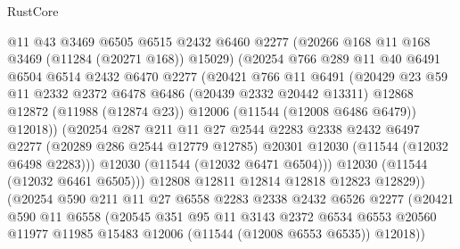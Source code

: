 \begin{lexlean}{RustCore}
\begin{coremodule}
                  @11
                  @43
                  @3469
                  @6505
                  @6515
                  @2432
                  @6460
                  @2277
                  (@20266 @168 @11 @168 @3469 (@11284 (@20271 @168)) @15029)
                  (@20254
                    @766
                    @289
                    @11
                    @40
                    @6491
                    @6504
                    @6514
                    @2432
                    @6470
                    @2277
                    (@20421
                      @766
                      @11
                      @6491
                      (@20429
                        @23
                        @59
                        @11
                        @2332
                        @2372
                        @6478
                        @6486
                        (@20439 @2332 @20442 @13311)
                        @12868
                        @12872
                        (@11988 (@12874 @23))
                        @12006
                        (@11544 (@12008 @6486 @6479))
                        @12018))
                    (@20254
                      @287
                      @211
                      @11
                      @27
                      @2544
                      @2283
                      @2338
                      @2432
                      @6497
                      @2277
                      (@20289 @286 @2544 @12779 @12785)
                      @20301
                      @12030
                      (@11544 (@12032 @6498 @2283)))
                    @12030
                    (@11544 (@12032 @6471 @6504)))
                  @12030
                  (@11544 (@12032 @6461 @6505)))
                @12808
                @12811
                @12814
                @12818
                @12823
                @12829))
            (@20254
              @590
              @211
              @11
              @27
              @6558
              @2283
              @2338
              @2432
              @6526
              @2277
              (@20421
                @590
                @11
                @6558
                (@20545
                  @351
                  @95
                  @11
                  @3143
                  @2372
                  @6534
                  @6553
                  @20560
                  @11977
                  @11985
                  @15483
                  @12006
                  (@11544 (@12008 @6553 @6535))
                  @12018))

\end{coremodule}
\end{lexlean}
